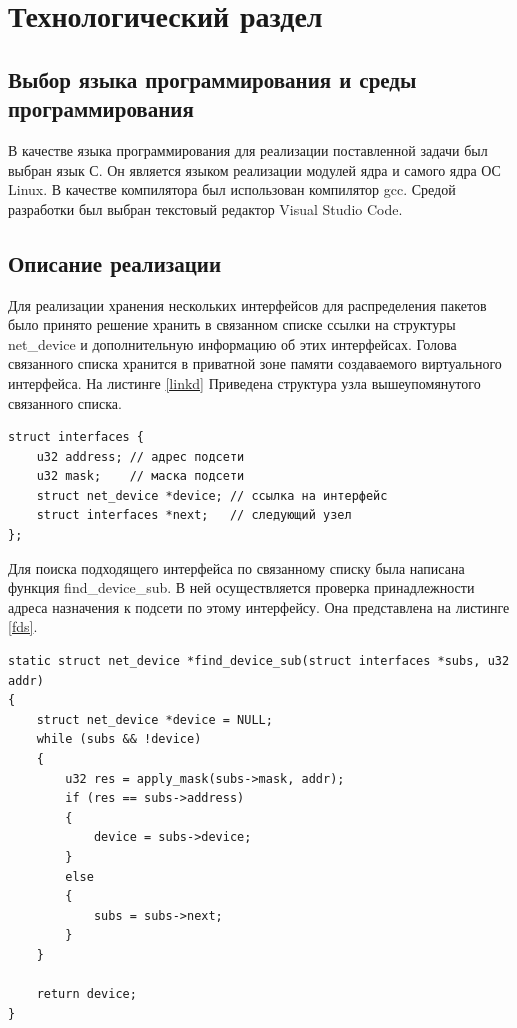 \documentclass[14pt, a4paper]{extarticle}
\begin{document}
\clearpage
\section{Технологический раздел}
\subsection{Выбор языка программирования и среды программирования}
В качестве языка программирования для реализации поставленной
задачи был выбран язык С. Он является языком реализации модулей ядра и самого ядра ОС Linux. В качестве компилятора был использован
компилятор gcc. Средой разработки был выбран текстовый редактор Visual Studio Code.

\subsection{Описание реализации}
Для реализации хранения нескольких интерфейсов для распределения пакетов было принято решение хранить в связанном списке ссылки на структуры net\_device и дополнительную информацию об этих интерфейсах. Голова связанного списка хранится в приватной зоне памяти создаваемого виртуального интерфейса. На листинге \ref{linkd} Приведена структура узла вышеупомянутого связанного списка.

\begin{lstlisting}[caption=lst example, label={linkd}]
struct interfaces {
    u32 address; // адрес подсети
    u32 mask;    // маска подсети
    struct net_device *device; // ссылка на интерфейс
    struct interfaces *next;   // следующий узел
};
\end{lstlisting}

Для поиска подходящего интерфейса по связанному списку была написана функция find\_device\_sub. В ней осуществляется проверка принадлежности адреса назначения к подсети по этому интерфейсу. Она представлена на листинге \ref{fds}.

\begin{lstlisting}[caption=lst example, label=fds]
static struct net_device *find_device_sub(struct interfaces *subs, u32 addr)
{
    struct net_device *device = NULL;
    while (subs && !device)
    {
        u32 res = apply_mask(subs->mask, addr);
        if (res == subs->address)
        {
            device = subs->device;
        }
        else
        {
            subs = subs->next;
        }
    }

    return device;
}
\end{lstlisting}
\end{document}

